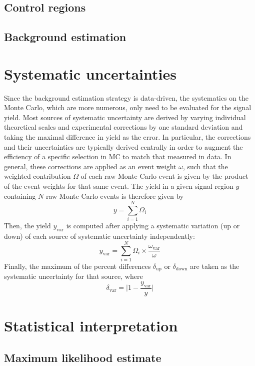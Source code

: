 \subsection{Control regions}
\subsection{Background estimation}

\section{Systematic uncertainties}
Since the background estimation strategy is data-driven, the systematics on the Monte Carlo, which are more numerous, only need to be evaluated for the signal yield. 
Most sources of systematic uncertainty are derived by varying individual theoretical scales and experimental corrections by one standard deviation and taking the maximal difference in yield as the error. 
In particular, the corrections and their uncertainties are typically derived centrally in order to augment the efficiency of a specific selection in MC to match that measured in data.
In general, these corrections are applied as an event weight $\omega$, such that the weighted contribution $\Omega$ of each raw Monte Carlo event is given by the product of the event weights for that same event. 
The yield in a given signal region $y$ containing $N$ raw Monte Carlo events is therefore given by
\begin{equation}
    y = \sum_{i = 1}^{N}\Omega_i
\end{equation}
Then, the yield $y_\text{var}$ is computed after applying a systematic variation (up or down) of each source of systematic uncertainty independently:
\begin{equation}\label{eq:systs}
    y_\text{var} = \sum_{i = 1}^{N}\Omega_i\times\frac{\omega_\text{var}}{\omega}
\end{equation}
Finally, the maximum of the percent differences $\delta_\text{up}$ or $\delta_\text{down}$ are taken as the systematic uncertainty for that source, where
\begin{equation}
    \delta_\text{var} = \bigg| 1-\frac{y_\text{var}}{y} \bigg|
\end{equation}

\section{Statistical interpretation}
\subsection{Maximum likelihood estimate}


